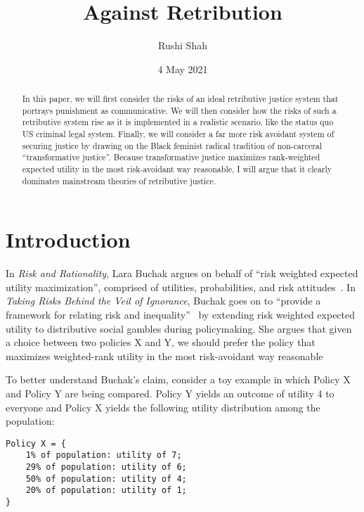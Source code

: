 \documentclass{article}
\title{Against Retribution}
\author{Rushi Shah}
\date{4 May 2021}
\begin{document}
\maketitle


    \begin{abstract}

        In this paper, we will first consider the risks of an ideal retributive justice system that portrays punishment as communicative. We will then consider how the risks of such a retributive system rise as it is implemented in a realistic scenario, like the status quo US criminal legal system. Finally, we will consider a far more risk avoidant system of securing justice by drawing on the Black feminist radical tradition of non-carceral ``transformative justice''. Because transformative justice maximizes rank-weighted expected utility in the most risk-avoidant way reasonable, I will argue that it clearly dominates mainstream theories of retributive justice. 

    \end{abstract}

    \section{Introduction}

        In \textit{Risk and Rationality}, Lara Buchak argues on behalf of ``risk weighted expected utility maximization'', comprised of utilities, probabilities, and risk attitudes~\cite{risk-and-rationality}. In \textit{Taking Risks Behind the Veil of Ignorance}, Buchak goes on to ``provide a framework for relating risk and inequality''~\cite{taking-risks-behind-the-veil-of-ignorance} by extending risk weighted expected utility to distributive social gambles during policymaking. She argues that given a choice between two policies X and Y, we should prefer the policy that maximizes weighted-rank utility in the most risk-avoidant way reasonable

        To better understand Buchak's claim, consider a toy example in which Policy X and Policy Y are being compared. Policy Y yields an outcome of utility 4 to everyone and Policy X yields the following utility distribution among the population: 

\begin{lstlisting}[breaklines]
Policy X = {
    1% of population: utility of 7;
    29% of population: utility of 6;
    50% of population: utility of 4;
    20% of population: utility of 1;
} 
\end{lstlisting}
\end{document}
